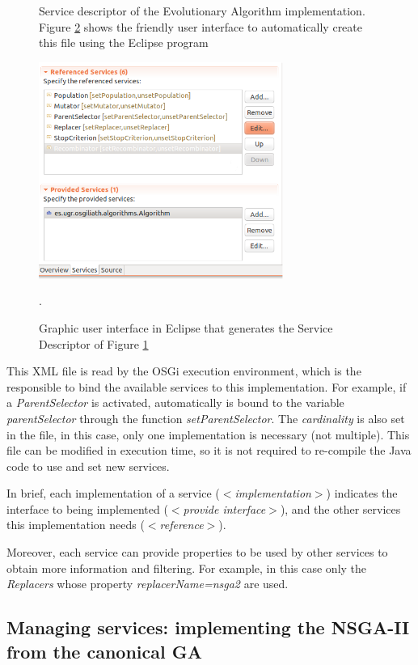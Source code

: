 \begin{figure}
\usebox{\mintedboxDS}
\caption{Service descriptor of the Evolutionary Algorithm implementation.  Figure \ref{fig:xmlgui} shows the friendly user interface to automatically create  this file using the Eclipse program} 
\label{fig:ds} 
\end{figure}

\begin{figure}
\centering
\includegraphics[width=8cm]{gfx/osgiliath/eclipse.png}

\caption{Graphic user interface in Eclipse that generates the Service Descriptor of Figure \ref{fig:ds} }.
\label{fig:xmlgui}
\end{figure}

This XML file is read by the OSGi execution environment, which is the responsible to bind the available services to this implementation. For example, if a {\em ParentSelector} is activated, automatically is bound to the variable {\em parentSelector} through the function {\em setParentSelector}. The {\em cardinality} is also set in the file, in this case, only one implementation is necessary (not multiple). This file can be modified in execution time, so it is not required to re-compile the Java code to use and set new services.

In brief, each implementation of a service (\textit{$<$im\-ple\-men\-ta\-tion$>$}) indicates the interface to being implemented (\textit{$<$pro\-vi\-de in\-ter\-fa\-ce$>$}), and the other services this implementation needs (\textit{$<$re\-fe\-ren\-ce$>$}). 

Moreover, each service can provide properties to be used by other services to obtain more information and filtering. For example, in this case only the {\em Replacers} whose property {\em replacerName=nsga2} are used.


\subsection{Managing services: implementing the NSGA-II from the canonical GA}

